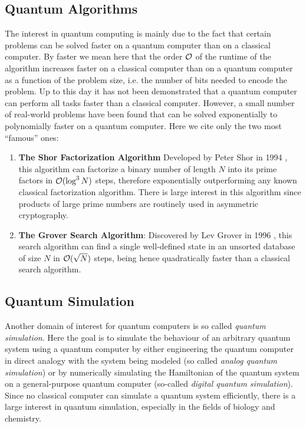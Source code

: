 \subsection{Quantum Algorithms}

The interest in quantum computing is mainly due to the fact that certain problems can be solved faster on a quantum computer than on a classical computer. By faster we mean here that the order $\cal{O}$ of the runtime of the algorithm increases faster on a classical computer than on a quantum computer as a function of the problem size, i.e. the number of bits needed to encode the problem. Up to this day it has not been demonstrated that a quantum computer can perform all tasks faster than a classical computer. However, a small number of real-world problems have been found that can be solved exponentially to polynomially faster on a quantum computer. Here we cite only the two most ``famous'' ones:

\begin{enumerate}
\item \textbf{The Shor Factorization Algorithm} Developed by Peter Shor in 1994 \citep{shor_algorithms_1994,shor_polynomial-time_1995}, this algorithm can factorize a binary number of length $N$ into its prime factors in $\begin{mathcal}O\end{mathcal}(\log^3{N})$ steps, therefore exponentially outperforming any known classical factorization algorithm. There is large interest in this algorithm since products of large prime numbers are routinely used in asymmetric cryptography.
\item \textbf{The Grover Search Algorithm}: Discovered by Lev Grover in 1996 \citep{grover_fast_1996}, this search algorithm can find a single well-defined state in an unsorted database of size $N$ in $\begin{mathcal}O\end{mathcal}(\sqrt{N})$ steps, being hence quadratically faster than a classical search algorithm.
\end{enumerate}

\subsection{Quantum Simulation}

Another domain of interest for quantum computers is so called {\it quantum simulation}. Here the goal is to simulate the behaviour of an arbitrary quantum system using a quantum computer by either engineering the quantum computer in direct analogy with the system being modeled (so called {\it analog quantum simulation}) or by numerically simulating the Hamiltonian of the quantum system on a general-purpose quantum computer (so-called {\it digital quantum simulation}). Since no classical computer can simulate a quantum system efficiently, there is a large interest in quantum simulation, especially in the fields of biology and chemistry.


